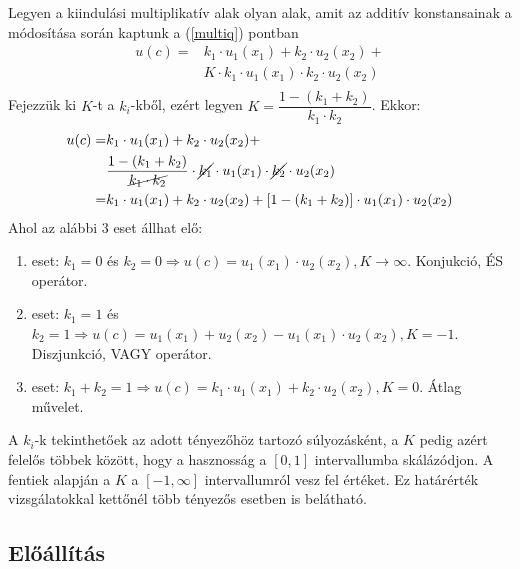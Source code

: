 \documentclass[a4paper,12pt]{article}
\begin{document}
Legyen a kiindulási multiplikatív alak olyan alak, amit az additív konstansainak a módosítása során kaptunk a (\ref{multiq}) pontban
\begin{equation}
\begin{split}
u(c) = & k_1\cdot u_1(x_1) + k_2\cdot u_2(x_2)+ \\
&K\cdot  k_{1}\cdot u_1(x_1)\cdot k_{2}\cdot u_2(x_2) \\
\end{split}
\end{equation}
Fejezzük ki $K$-t a $k_i$-kből, ezért legyen $K = \dfrac{1 - (k_1 + k_2)}{k_1\cdot k_2}$. Ekkor:
\begin{equation}
\begin{split}
u(c) = & k_1\cdot u_1(x_1) + k_2\cdot u_2(x_2)+ \\
&\dfrac{1 - (k_1 + k_2)}{ \cancel{k_1\cdot k_2} } \cdot   \cancel{k_{1}}\cdot u_1(x_1)\cdot  \cancel{k_{2}}\cdot u_2(x_2) \\
= & k_1\cdot u_1(x_1) + k_2\cdot u_2(x_2)+ [1 - (k_1 + k_2)]\cdot u_1(x_1)\cdot u_2(x_2) \\
\end{split}
\end{equation}
Ahol az alábbi 3 eset állhat elő:
\begin{enumerate}
\item eset: $k_1 = 0$ és $k_2 = 0 \Rightarrow u(c) = u_1(x_1) \cdot  u_2(x_2), K \rightarrow \infty$. Konjukció, ÉS operátor. 
\item eset: $k_1 = 1$ és $k_2 = 1 \Rightarrow u(c) = u_1(x_1) + u_2(x_2) - u_1(x_1)\cdot  u_2(x_2), K = -1$. Diszjunkció, VAGY operátor.  
\item eset: $k_1 + k_2 = 1 \Rightarrow u(c) = k_1\cdot u_1(x_1) + k_2\cdot u_2(x_2), K = 0 $. Átlag művelet.
\end{enumerate} 

A $k_i$-k tekinthetőek az adott tényezőhöz tartozó súlyozásként, a $K$ pedig azért felelős többek között, hogy a hasznosság a $[0,1]$ intervallumba skálázódjon. A fentiek alapján a $K$ a $[-1, \infty]$ intervallumról vesz fel értéket. Ez határérték vizsgálatokkal kettőnél több tényezős esetben is belátható.


\subsection{Előállítás}
\end{document}
